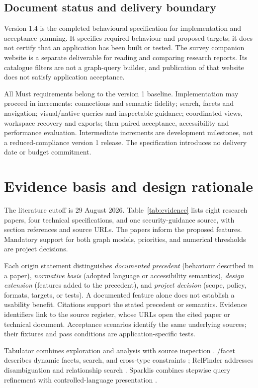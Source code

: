 \documentclass[11pt,a4paper]{article}
\begin{document}
\subsection{Document status and delivery boundary}
Version 1.4 is the completed behavioural specification for implementation and acceptance planning. It specifies required behaviour and proposed targets; it does not certify that an application has been built or tested. The survey companion website is a separate deliverable for reading and comparing research reports. Its catalogue filters are not a graph-query builder, and publication of that website does not satisfy application acceptance.

All Must requirements belong to the version 1 baseline. Implementation may proceed in increments: connections and semantic fidelity; search, facets and navigation; visual/native queries and inspectable guidance; coordinated views, workspace recovery and exports; then paired acceptance, accessibility and performance evaluation. Intermediate increments are development milestones, not a reduced-compliance version 1 release. The specification introduces no delivery date or budget commitment.

\section{Evidence basis and design rationale}
The literature cutoff is 29 August 2026. Table~\ref{tab:evidence} lists eight research papers, four technical specifications, and one security-guidance source, with section references and source URLs. The papers inform the proposed features. Mandatory support for both graph models, priorities, and numerical thresholds are project decisions.

Each origin statement distinguishes \emph{documented precedent} (behaviour described in a paper), \emph{normative basis} (adopted language or accessibility semantics), \emph{design extension} (features added to the precedent), and \emph{project decision} (scope, policy, formats, targets, or tests). A documented feature alone does not establish a usability benefit. Citations support the stated precedent or semantics. Evidence identifiers link to the source register, whose URLs open the cited paper or technical document. Acceptance scenarios identify the same underlying sources; their fixtures and pass conditions are application-specific tests.

Tabulator combines exploration and analysis with source inspection \citep[Sections 3.1--3.4]{tabulator}. /facet describes dynamic facets, search, and cross-type constraints \citep[Sections 3--4]{facet}; RelFinder addresses disambiguation and relationship search \citep[Sections 2.1--2.3]{relfinder}. Sparklis combines stepwise query refinement with controlled-language presentation \citep[Sections 3 and 5]{sparklis}.
\end{document}
